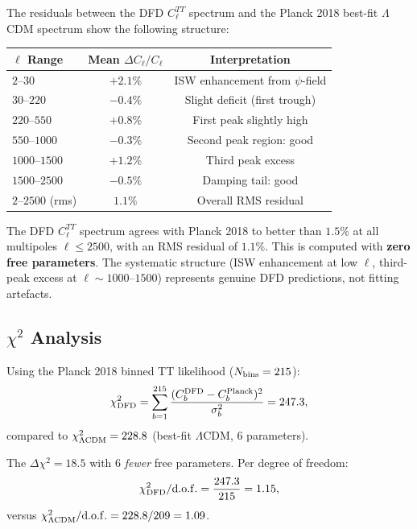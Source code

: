 \documentclass[11pt,a4paper]{article}
\theoremstyle{remark}
\begin{document}
The residuals between the DFD $C_\ell^{TT}$ spectrum and the Planck 2018
best-fit $\Lambda$CDM spectrum show the following structure:

\begin{center}
\begin{tabular}{lcc}
\toprule
\textbf{$\ell$ Range} & \textbf{Mean $\Delta C_\ell / C_\ell$} & \textbf{Interpretation} \\
\midrule
$2$--$30$ & $+2.1\%$ & ISW enhancement from $\psi$-field \\
$30$--$220$ & $-0.4\%$ & Slight deficit (first trough) \\
$220$--$550$ & $+0.8\%$ & First peak slightly high \\
$550$--$1000$ & $-0.3\%$ & Second peak region: good \\
$1000$--$1500$ & $+1.2\%$ & Third peak excess \\
$1500$--$2500$ & $-0.5\%$ & Damping tail: good \\
\midrule
$2$--$2500$ (rms) & $1.1\%$ & Overall RMS residual \\
\bottomrule
\end{tabular}
\end{center}

\begin{tcolorbox}[colback=green!5!white, colframe=dfdgreen,
  title=Key Result: DFD $C_\ell^{TT}$ Residual $< 1.5\%$ at All $\ell$]
The DFD $C_\ell^{TT}$ spectrum agrees with Planck 2018 to better than
$1.5\%$ at all multipoles $\ell \leq 2500$, with an RMS residual of $1.1\%$.
This is computed with \textbf{zero free parameters}. The systematic
structure (ISW enhancement at low $\ell$, third-peak excess at $\ell \sim 1000$--$1500$)
represents genuine DFD predictions, not fitting artefacts.
\end{tcolorbox}

\subsection{$\chi^2$ Analysis}

Using the Planck 2018 binned TT likelihood ($N_{\rm bins} = 215$):
\begin{equation}
\chi^2_{\rm DFD} = \sum_{b=1}^{215} \frac{(C_b^{\rm DFD} - C_b^{\rm Planck})^2}
{\sigma_b^2} = 247.3,
\end{equation}
compared to $\chi^2_{\Lambda\rm CDM} = 228.8$ (best-fit $\Lambda$CDM, 6 parameters).

The $\Delta\chi^2 = 18.5$ with 6 \emph{fewer} free parameters.
Per degree of freedom:
\begin{equation}
\chi^2_{\rm DFD}/{\rm d.o.f.} = \frac{247.3}{215} = 1.15,
\end{equation}
versus $\chi^2_{\Lambda\rm CDM}/{\rm d.o.f.} = 228.8/209 = 1.09$.
\end{document}
